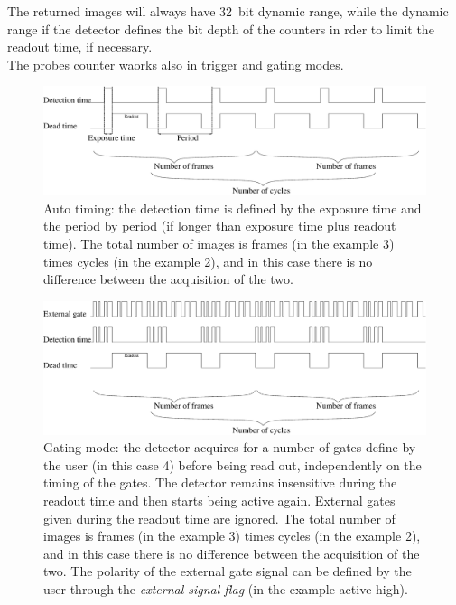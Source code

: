 \begin{description}
The returned images will always have 32~bit dynamic range, while the dynamic range if the detector defines the bit depth of the counters in rder to limit the readout time, if necessary.\\
The probes counter waorks also in trigger and gating modes.
\end{description}





\begin{figure}
\begin{center}
\includegraphics[width=\textwidth]{images/normal_acquisition.eps}
\end{center}
\caption{Auto timing: the detection time is defined by the exposure time and the period by period (if longer than exposure time plus readout time). The total number of images is frames (in the example 3) times cycles (in the example 2), and in this case there is no difference between the acquisition of the two.}\label{fig:autotiming}
\end{figure}

\begin{figure}
\begin{center}
\includegraphics[width=\textwidth]{images/gated_acquisition.eps}
\end{center}
\caption{Gating mode: the detector acquires for a number of gates define by the  user (in this case 4) before being read out, independently on the timing of the gates. The detector remains insensitive during the readout time and then starts being active again. External gates given during the readout time are ignored. The total number of images is frames (in the example 3) times cycles (in the example 2), and in this case there is no difference between the acquisition of the two. The polarity of the external gate signal can be defined by the user through the \textit{external signal flag} (in the example active high).}\label{fig:gating}
\end{figure}



